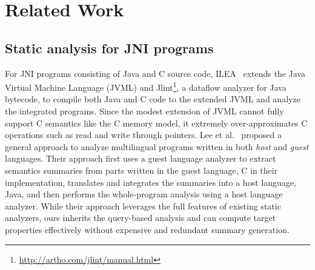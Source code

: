 \section{Related Work}\label{sec:related}
\subsection{Static analysis for JNI programs}

For JNI programs consisting of Java and C source code, ILEA~\cite{ILEA} extends
the Java Virtual Machine Language (JVML) and
Jlint\footnote{\url{http://artho.com/jlint/manual.html}}, a dataflow analyzer
for Java bytecode, to compile both Java and C code to the extended JVML and
analyze the integrated programs.  Since the modest extension of JVML cannot
fully support C semantics like the C memory model, it extremely
over-approximates C operations such as read and write through pointers.  Lee et
al.~\cite{LeeASE20} proposed a general approach to analyze multilingual
programs written in both {\it host} and {\it guest} languages.  Their approach
first uses a guest language analyzer to extract semantics summaries from parts
written in the guest language, C in their implementation, translates and
integrates the summaries into a host language, Java, and then performs the
whole-program analysis using a host language analyzer.  While their approach
leverages the full features of existing static analyzers, ours inherits the
query-based analysis and can compute target properties effectively without
expensive and redundant summary generation.

